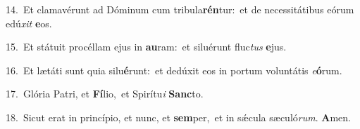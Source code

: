 {\numbfont\textcolor{\numbcolor}{14.}}~Et clamavérunt ad Dóminum cum tribula\-\textbf{rén}\-tur:~\star et de necessitátibus eórum edú\textit{xit} \textbf{e}\-os.\par
{\numbfont\textcolor{\numbcolor}{15.}}~Et státuit procéllam ejus in \textbf{au}\-ram:~\star et siluérunt fluc\textit{tus} \textbf{e}\-jus.\par
{\numbfont\textcolor{\numbcolor}{16.}}~Et lætáti sunt quia silu\-\textbf{é}\-runt:~\star et dedúxit eos in portum voluntátis \textit{e}\-\textbf{ó}rum.\par
{\numbfont\textcolor{\numbcolor}{17.}}~Glória Patri, et \textbf{Fí}\-lio,~\star et Spirítu\textit{i} \textbf{Sanc}\-to.\par
{\numbfont\textcolor{\numbcolor}{18.}}~Sicut erat in princípio, et nunc, et \textbf{sem}\-per,~\star et in sǽcula sæculó\-\textit{rum}\-. \textbf{A}\-men.\par
